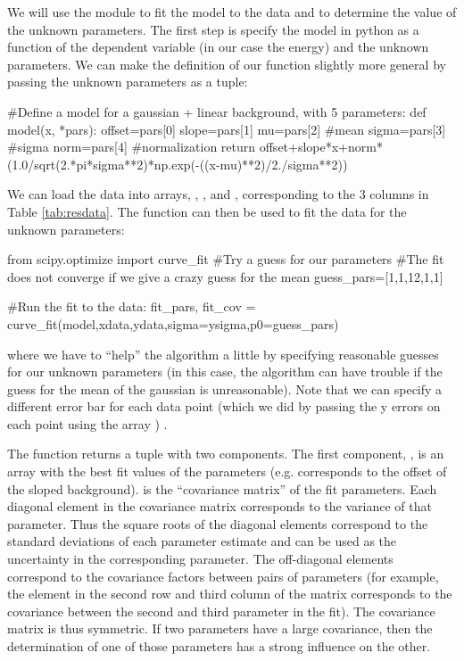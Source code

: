 We will use the  module to fit the model to the data and to determine the value of the unknown parameters. The first step is specify the model in python as a function of the dependent variable (in our case the energy) and the unknown parameters. We can make the definition of our function slightly more general by passing the unknown parameters as a tuple:
\begin{python}[caption = Defining a function for a non-linear fit] 
#Define a model for a gaussian + linear background, with 5 parameters:
def model(x, *pars):
    offset=pars[0]
    slope=pars[1]
    mu=pars[2] #mean
    sigma=pars[3] #sigma
    norm=pars[4] #normalization
    return offset+slope*x+norm*(1.0/sqrt(2.*pi*sigma**2)*np.exp(-((x-mu)**2)/2./sigma**2))
\end{python}
We can load the data into arrays, , , and , corresponding to the 3 columns in Table \ref{tab:resdata}. The  function can then be used to fit the data for the unknown parameters:
\begin{python}[caption = Non-linear fit in python] 
from scipy.optimize import curve_fit 
#Try a guess for our parameters
#The fit does not converge if we give a crazy guess for the mean
guess_pars=[1,1,12,1,1]

#Run the fit to the data:
fit_pars, fit_cov = curve_fit(model,xdata,ydata,sigma=ysigma,p0=guess_pars)
\end{python}
where we have to ``help'' the algorithm a little by specifying reasonable guesses for our unknown parameters (in this case, the algorithm can have trouble if the guess for the mean of the gaussian is unreasonable). Note that we can specify a different error bar for each data point (which we did by passing the y errors on each point using the array ) . 

The  function returns a tuple with two components. The first component, , is an array with the best fit values of the parameters (e.g.  corresponds to the offset of the sloped background).  is the ``covariance matrix'' of the fit parameters. Each diagonal element in the covariance matrix corresponds to the variance of that parameter. Thus the square roots of the diagonal elements correspond to the standard deviations of each parameter estimate and can be used as the uncertainty in the corresponding parameter. The off-diagonal elements correspond to the covariance factors between pairs of parameters (for example, the element in the second row and third column of the matrix corresponds to the covariance between the second and third parameter in the fit). The covariance matrix is thus symmetric. If two parameters have a large covariance, then the determination of one of those parameters has a strong influence on the other. 


